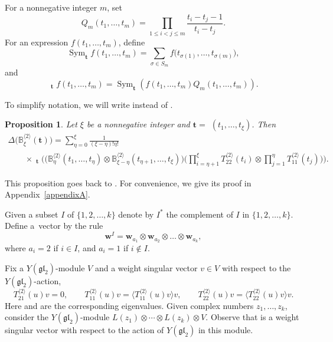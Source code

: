 \documentclass[pdftex]{sigma}
\numberwithin{equation}{section}
\newtheorem{Proposition}[Theorem]{Proposition}
 { \theoremstyle{definition}
\newtheorem{Definition}[Theorem]{Definition}
\newtheorem*{Example}{Example}
\newtheorem*{Remark}{Remark} }
\DeclareMathOperator{\Sym}{Sym }
\DeclareMathOperator{\Symb}{\overline{Sym} }
\newcommand\ltwo{\langle 2\rangle}
\begin{document}
For a nonnegative integer $m$, set
\begin{equation}\label{Qfun}
Q_{m} (t_{1}, \dots, t_{m} )=\prod_{1 \leqslant i<j \leqslant m} \frac{t_{i}-t_{j}-1}{t_{i}-t_{j}}.
\end{equation}
For an expression $f (t_{1},\dots,t_m )$, define
\begin{equation*}
\Sym_{\boldsymbol{t}} f (t_{1}, \dots, t_m )=\sum_{\sigma\in S_m} f \bigl(t_{\sigma(1)}, \dots, t_{\sigma(m)} \bigr),
\end{equation*}
and
\begin{equation}\label{barsym}
\Symb_{\boldsymbol{t}} f(t_{1}, \dots, t_m)=
\Sym_{\boldsymbol{t}} (f(t_{1}, \dots, t_m) Q_m (t_{1}, \dots, t_m ) ).
\end{equation}

To simplify notation, we will write \smash{$T^{\ltwo}_{ij}$} instead of \smash{$\bigl(T^{\ltwo}\bigr)^i_j$}.

\begin{Proposition}\label{twotensor}
Let $\xi$ be a nonnegative integer and $\boldsymbol{t}=$ $(t_{1}, \dots, t_{\xi} )$. Then
\begin{gather*}
\Delta \bigl( \mathbb{B}^{\ltwo}_{\xi}(\boldsymbol{t}) \bigr)=
\sum_{\eta=0}^{\xi} \frac{1}{(\xi-\eta) ! \eta!}\\
\qquad\times
\Symb_{\boldsymbol{t}}\Biggl( \bigl(\mathbb{B}^{\ltwo}_{\eta}(t_1,\dots,t_\eta) \otimes \mathbb{B}^{\ltwo}_{\xi-\eta}(t_{\eta+1},\dots,t_{\xi}) \bigr)
 \Biggl(\prod_{i=\eta+1}^{\xi } T^{\ltwo}_{22}(t_{i})\otimes \prod_{j=1}^{\eta} T^{\ltwo}_{11}(t_j)\Biggr) \Biggr).
\end{gather*}
\end{Proposition}
This proposition goes back to \cite{Kor,TV}. For convenience, we give its proof in Appendix~\ref{appendixA}.

Given a subset $I $ of $ \{1,2,\dots, k\}$ denote by $I^*$ the complement of $I$ in $\{1,2,\dots,k\}$. Define a~vector  by the rule{\samepage
\begin{equation*} \mathbf{w}^{I}=\mathbf{w}_{a_1}\otimes \mathbf{w}_{a_2}\otimes\dots\otimes \mathbf{w}_{a_k},\end{equation*}
where $a_i=2$ if $i\in I$, and $a_i=1$ if $i\not\in I$.}

Fix a $Y(\mathfrak{g l}_{2})$-module $V$ and a weight singular vector $v \in V$ with respect to the $Y(\mathfrak{g l}_{2})$-action,
\begin{equation*}
T^{\ltwo}_{21}(u)v=0, \qquad T^{\ltwo}_{11}(u)v=\bigl\langle T^{\ltwo}_{11}(u)v \bigr\rangle v,\qquad T^{\ltwo}_{22}(u)v=\bigl\langle T^{\ltwo}_{22}(u)v \bigr\rangle v.
\end{equation*}
Here \smash{$\bigl\langle T^{\ltwo}_{11}(u)v \bigr\rangle$} and \smash{$\bigl\langle T^{\ltwo}_{22}(u)v \bigr\rangle$} are the corresponding eigenvalues.
Given complex numbers $z_1,\dots,z_k$, consider the $Y(\mathfrak{g l}_{2})$-module $L(z_1) \otimes \cdots \otimes L(z_k) \otimes V $. Observe that  is a weight singular vector with respect to the action of $Y(\mathfrak{g l}_{2})$ in this module.
\end{document}
